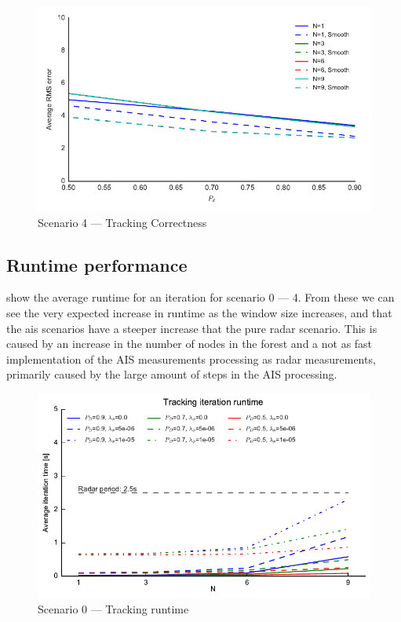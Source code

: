 \begin{figure}
\includegraphics{Figures/plots/Scenario4_Tracking-TrackingCorrectness.pdf}
\caption{Scenario 4 --- Tracking Correctness}\label{fig:scenario4_tracking_correctness}
\end{figure}
\clearpage{}

\subsection{Runtime performance}
 show the average runtime for an iteration for scenario 0 --- 4. From these we can see the very expected increase in runtime as the window size increases, and that the \gls{ais} scenarios have a steeper increase that the pure radar scenario. This is caused by an increase in the number of nodes in the forest and a not as fast implementation of the AIS measurements processing as radar measurements, primarily caused by the large amount of steps in the AIS processing.

\begin{figure}[H]
\centering
\includegraphics{Figures/plots/Scenario0_Tracking-Runtime.pdf}
\caption{Scenario 0 --- Tracking runtime}\label{fig:scenario0_tracking_runtime}
\end{figure}

